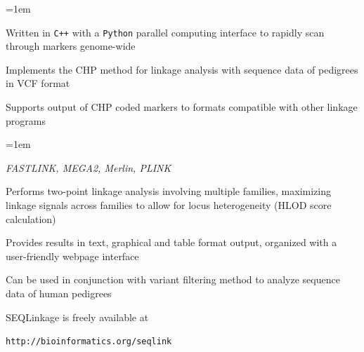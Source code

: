 \documentclass[ansiepaper, portrait, fontscale=0.35]{baposter} %
\newcommand{\cir}[1]{%
\tikz{\useasboundingbox (-0.2em,-0.32em) rectangle(0.2em,0.32em); \draw[draw=BaylorBurgundy,fill=BaylorBurgundy!#1!white,line width=0.03em] (0,0) circle(0.2em);}}
\newcommand{\tri}{\color{BaylorBurgundy}{$\triangleright$}}
\newcommand{\hf}[1]{{\color{BaylorBurgundy}\textbf{#1}}}
\newcommand{\clist}[1]{%
\begin{list}{\labelitemi}{\leftmargin=1em}
\setlength{\parindent}{5em}
\setlength{\itemsep}{0.2em}
\setlength{\parskip}{0em}
\setlength{\parsep}{0em}
#1
\end{list}
}
\begin{document}
\begin{poster}
{%
    \clist{
      \item[\cir{100}] Written in \texttt{C++} with a \texttt{Python} parallel computing interface to rapidly scan through markers genome-wide
      \item[\cir{100}] Implements the CHP method for linkage analysis with sequence data of pedigrees in VCF format
      \item[\cir{100}] Supports output of CHP coded markers to formats compatible with other linkage programs
             \clist{
              \item[\tri] \textit{FASTLINK, MEGA2, Merlin, PLINK}
              }
      \item[\cir{100}] Performs two-point linkage analysis involving multiple families, maximizing linkage signals across families to allow for locus heterogeneity (HLOD score calculation)
      \item[\cir{100}] Provides results in text, graphical and table format output, organized with a user-friendly webpage interface
      \item[\cir{100}] Can be used in conjunction with variant filtering method to analyze sequence data of human pedigrees
    }
  SEQLinkage is freely available at
  \begin{center}
  \texttt{http://bioinformatics.org/seqlink} 
  \end{center}
  }
\end{poster}
\end{document}
